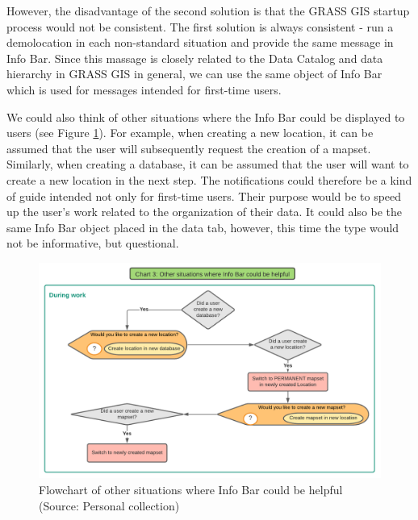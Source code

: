 \documentclass[a4paper,10pt,twoside]{article}
\begin{document}
\noindent However, the disadvantage of the second solution is that the GRASS GIS startup process would not be consistent. The first solution is always consistent - run a demolocation in each non-standard situation and provide the same message in Info Bar. Since this massage is closely related to the Data Catalog and data hierarchy in GRASS GIS in general, we can use the same object of Info Bar which is used for messages intended for first-time users.

We could also think of other situations where the Info Bar could be displayed to users (see Figure \ref{fig:other_situations}). For example, when creating a new location, it can be assumed that the user will subsequently request the creation of a mapset. Similarly, when creating a database, it can be assumed that the user will want to create a new location in the next step. The notifications could therefore be a kind of guide intended not only for first-time users. Their purpose would be to speed up the user's work related to the organization of their data. It could also be the same Info Bar object placed in the data tab, however, this time the type would not be informative, but questional.

\vspace{0.3cm}
\begin{figure}[hbt!] 
\begin{center}
\includegraphics[width=17cm]{../pictures/other_situations.png} 
\caption[Flowchart of other situations where Info Bar could be helpful]{Flowchart of other situations where Info Bar could be helpful (Source: Personal collection)}
\label{fig:other_situations}
\end{center}
\end{figure}
\end{document}
